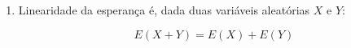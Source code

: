 \item
	\begin{enumerate}
		\item
		Linearidade da esperança é, dada duas variáveis aleatórias $X$ e $Y$:

    \[E(X + Y) = E(X) + E(Y)\]

	\end{enumerate}
